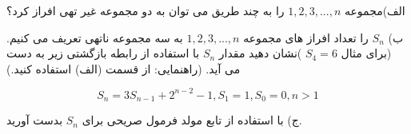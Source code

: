 \exercise
الف)مجموعه
${1, 2, 3, ..., n}$
را به چند طریق می توان به دو مجموعه غیر تهی افراز کرد؟

ب)
$S_n$
را تعداد افراز های مجموعه
${1, 2, 3, ..., n}$
به سه مجموعه ناتهی تعریف می کنیم.(برای مثال
$S_4 = 6$
)نشان دهید مقدار
$S_n$
با استفاده از رابطه بازگشتی زیر به دست می آید.
(راهنمایی: از قسمت (الف) استفاده کنید.)

$$S_n = 3S_{n-1} + 2^{n-2} - 1, S_1 = 1, S_0 = 0, n > 1$$

ج) با استفاده از تابع مولد فرمول صریحی برای
$S_n$
بدست آورید.